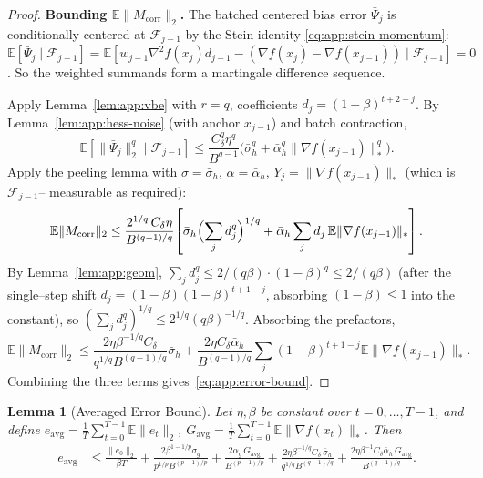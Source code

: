 \documentclass{article}
\theoremstyle{plain}
\newtheorem{lemma}[theorem]{Lemma}
\theoremstyle{definition}
\theoremstyle{remark}
\begin{document}
\begin{proof}
\smallskip\noindent\textbf{Bounding $\mathbb{E}\|M_{\mathrm{corr}}\|_2$.}
The batched centered bias error $\bar\Psi_j$ is conditionally centered
at $\mathcal{F}_{j-1}$ by the Stein identity
\eqref{eq:app:stein-momentum}: $\mathbb{E}[\bar\Psi_j \mid \mathcal{F}_{j-1}] =
\mathbb{E}[w_{j-1}\nabla^2 f(x_j) d_{j-1} - (\nabla f(x_j) - \nabla
f(x_{j-1})) \mid \mathcal{F}_{j-1}] = 0$. So the weighted summands form a
martingale difference sequence.

Apply Lemma~\ref{lem:app:vbe} with $r = q$, coefficients $d_j =
(1-\beta)^{t+2-j}$. By Lemma~\ref{lem:app:hess-noise}
(with anchor $x_{j-1}$) and batch contraction,
\[
  \mathbb{E}[\|\bar\Psi_j\|_2^q \mid \mathcal{F}_{j-1}]
  \leq \frac{C_\delta^q\eta^q}{B^{q-1}}\bigl(\bar\sigma_h^q
    + \bar\alpha_h^q\|\nabla f(x_{j-1})\|_*^q\bigr).
\]
Apply the peeling lemma with $\sigma = \bar\sigma_h$, $\alpha =
\bar\alpha_h$, $Y_j = \|\nabla f(x_{j-1})\|_*$ (which is $\mathcal{F}_{j-1}$--
measurable as required):
\[
  \mathbb{E}\|M_{\mathrm{corr}}\|_2
  \leq \frac{2^{1/q}\,C_\delta\eta}{B^{(q-1)/q}}\!\left[\bar\sigma_h
    \Bigl(\sum_j d_j^q\Bigr)^{1/q}
    + \bar\alpha_h\sum_j d_j\, \mathbb{E}\|\nabla f(x_{j-1})\|_*\right].
\]
By Lemma~\ref{lem:app:geom}, $\sum_j d_j^q \leq
2/(q\beta) \cdot (1-\beta)^q \leq 2/(q\beta)$ (after the single--step
shift $d_j = (1-\beta)(1-\beta)^{t+1-j}$, absorbing $(1-\beta) \leq 1$
into the constant), so $(\sum_j d_j^q)^{1/q} \leq 2^{1/q}(q\beta)^{-1/q}$.
Absorbing the prefactors,
\[
  \mathbb{E}\|M_{\mathrm{corr}}\|_2
  \leq \frac{2\eta\beta^{-1/q} C_\delta}{q^{1/q} B^{(q-1)/q}}\bar\sigma_h
    + \frac{2\eta C_\delta \bar\alpha_h}{B^{(q-1)/q}}\sum_j (1-\beta)^{t+1-j}
      \mathbb{E}\|\nabla f(x_{j-1})\|_*.
\]
Combining the three terms gives~\eqref{eq:app:error-bound}.
\end{proof}

\begin{lemma}[Averaged Error Bound]
\label{lem:app:avg-error}
Let $\eta, \beta$ be constant over $t = 0, \ldots, T-1$, and define
$e_{\mathrm{avg}} = \tfrac1T\sum_{t=0}^{T-1}\mathbb{E}\|e_t\|_2$,
$G_{\mathrm{avg}} = \tfrac1T\sum_{t=0}^{T-1}\mathbb{E}\|\nabla f(x_t)\|_*$.
Then
\begin{align}
  e_{\mathrm{avg}}
  &\leq \frac{\|e_0\|_2}{\beta T}
    + \frac{2\beta^{1-1/p}\sigma_g}{p^{1/p} B^{(p-1)/p}}
    + \frac{2\alpha_g\, G_{\mathrm{avg}}}{B^{(p-1)/p}}
    + \frac{2\eta\beta^{-1/q} C_\delta\,\bar\sigma_h}{q^{1/q} B^{(q-1)/q}}
    + \frac{2\eta\beta^{-1} C_\delta\bar\alpha_h\, G_{\mathrm{avg}}}{B^{(q-1)/q}}.
  \label{eq:app:avg-error}
\end{align}
\end{lemma}
\end{document}
